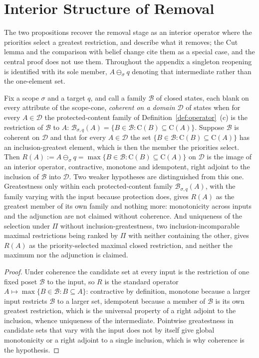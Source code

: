 \appendix
\section{Interior Structure of Removal}\label{app:interior}
\noindent The two propositions recover the removal stage as an interior operator where the priorities select a greatest restriction, and describe what it removes; the Cut lemma and the comparison with belief change cite them as a special case, and the central proof does not use them. Throughout the appendix a singleton reopening is identified with its sole member, $A \ominus_{\sigma} q$ denoting that intermediate rather than the one-element set.
\begin{proposition}\label{prop:interior}
Fix a scope $\sigma$ and a target $q$, and call a family $\mathcal{B}$ of closed states, each blank on every attribute of the scope-cone, \emph{coherent on a domain} $\mathcal{D}$ of states when for every $A \in \mathcal{D}$ the protected-content family of Definition~\ref{def:operator}~(c) is the restriction of $\mathcal{B}$ to $A$: $\mathcal{B}_{\sigma,q}(A) = \{B \in \mathcal{B} : \mathrm{C}(B) \subseteq \mathrm{C}(A)\}$. Suppose $\mathcal{B}$ is coherent on $\mathcal{D}$ and that for every $A \in \mathcal{D}$ the set $\{B \in \mathcal{B} : \mathrm{C}(B) \subseteq \mathrm{C}(A)\}$ has an inclusion-greatest element, which is then the member the priorities select. Then $R(A) := A \ominus_{\sigma} q = \max\{B \in \mathcal{B} : \mathrm{C}(B) \subseteq \mathrm{C}(A)\}$ on $\mathcal{D}$ is the image of an interior operator, contractive, monotone and idempotent, right adjoint to the inclusion of $\mathcal{B}$ into $\mathcal{D}$. Two weaker hypotheses are distinguished from this one. Greatestness only within each protected-content family $\mathcal{B}_{\sigma,q}(A)$, with the family varying with the input because protection does, gives $R(A)$ as the greatest member of its own family and nothing more: monotonicity across inputs and the adjunction are not claimed without coherence. And uniqueness of the selection under $\Pi$ without inclusion-greatestness, two inclusion-incomparable maximal restrictions being ranked by $\Pi$ with neither containing the other, gives $R(A)$ as the priority-selected maximal closed restriction, and neither the maximum nor the adjunction is claimed.
\end{proposition}
\begin{proof}
Under coherence the candidate set at every input is the restriction of one fixed poset $\mathcal{B}$ to the input, so $R$ is the standard operator $A \mapsto \max\{B \in \mathcal{B} : B \subseteq A\}$: contractive by definition, monotone because a larger input restricts $\mathcal{B}$ to a larger set, idempotent because a member of $\mathcal{B}$ is its own greatest restriction, which is the universal property of a right adjoint to the inclusion, whence uniqueness of the intermediate. Pointwise greatestness in candidate sets that vary with the input does not by itself give global monotonicity or a right adjoint to a single inclusion, which is why coherence is the hypothesis.
\end{proof}
